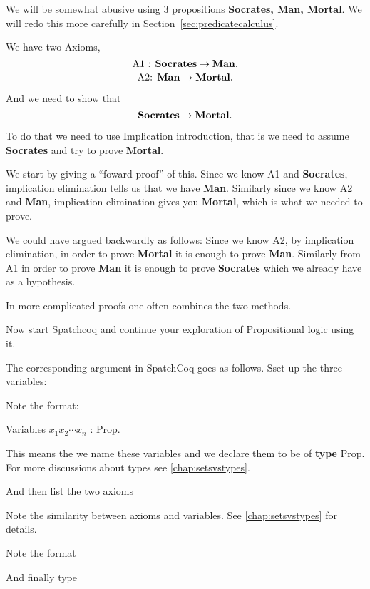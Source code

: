 \begin{itemize}
We will be somewhat abusive using 3 propositions {\bf Socrates, Man, Mortal}. We will redo this more carefully in Section~\ref{sec:predicatecalculus}.

We have two Axioms, 
$$\mbox{A1 :  \bf Socrates} \rightarrow \mbox{\bf Man}.$$
$$\mbox{A2: \bf  Man} \rightarrow \mbox{\bf Mortal}.$$



And we need to show that $$\mbox{\bf Socrates} \rightarrow \mbox{\bf Mortal}.$$



To do that we need to use Implication introduction, that is we need to assume {\bf Socrates} and try to prove {\bf Mortal}. 

 We start by giving a ``foward proof'' of this. Since we know  A1 and {\bf Socrates}, implication elimination tells us that we have {\bf Man}. Similarly since we know A2 and {\bf Man}, implication elimination gives you {\bf Mortal}, which is what we needed to prove.

We could have argued backwardly as follows: Since we know A2, by implication elimination, in order to prove {\bf Mortal} it is enough to prove {\bf Man}. Similarly from A1 in order to prove {\bf Man} it is enough to prove {\bf Socrates} which we already have as a hypothesis.

In more complicated proofs one often combines the two methods.

Now start Spatchcoq and continue your exploration of Propositional logic using it.

The corresponding argument in SpatchCoq goes as follows. Sset up the three variables:


Note the format: 

Variables $x_{1} x_{2} \cdots x_{n}$ : Prop.

This means the we name these variables and we declare them to be of  {\bf type} Prop. For more discussions about types see \ref{chap:setsvstypes}.
 
 

And then list the two axioms



Note the similarity between axioms and variables. See \ref{chap:setsvstypes} for details.

Note the format 

And finally type


\end{itemize}
